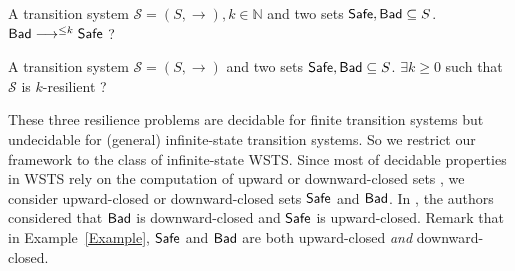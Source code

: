 {A transition system $\mathscr{S}=(S,\rightarrow), k \in \mathbb{N}$ and two sets $\Safe, \Bad \subseteq S$.}
{$\Bad \longrightarrow^{\leq k} \Safe$ ?\newline}

{A transition system $\mathscr{S}=(S,\rightarrow)$ and two sets $\Safe, \Bad \subseteq S$.}
{$\exists k \geq 0$ such that $\mathscr{S}$ is %
 $k$-resilient ?\newline}


\iffalse

\problemx{Resilience problems}
{A transition system $\mathscr{S}=(S,\rightarrow)$, two sets $\Safe, \Bad \subseteq S$, $k \in \mathbb{N}$.}
{ ({\sc resilience problem (RP)}) $\Bad \longrightarrow^{*} \Safe$ ?\newline  
({\sc $k$-resilience problem (kRP)})		$\Bad \longrightarrow^{\leq k} \Safe$ ?\newline
({\sc bounded resilience problem (BRP)})	$\exists k \geq 0$ such that $\mathscr{S}$ is 
 $k$-resilient ?\newline}

\fi


\iffalse
\begin{example}
Let us consider a VASS with only one state $q$, one counter, and one transition that substracts $-1$ from the counter, with $\Safe = \downarrow q(0)$, $\Bad = \uparrow q(1)$,
then resilience hold but not bounded resilience: for every bound $k$ there is an element of $\Bad$ e.g. $q(k+1)$ which necessitate at least $k+1$ steps before it can reach $\Safe$. 
\end{example}
\fi


  
These three resilience problems are decidable for finite transition systems but undecidable for (general) infinite-state transition systems. So we restrict our framework to the class of infinite-state WSTS. Since most of decidable properties in WSTS rely on the computation of upward or downward-closed sets \cite{DBLP:journals/iandc/AbdullaCJT00, DBLP:journals/tcs/FinkelS01}, we consider upward-closed or downward-closed sets $\Safe$ and $\Bad$. In \cite{DBLP:journals/corr/abs-2108-00889}, the authors considered that $\Bad$ is downward-closed and $\Safe$ is upward-closed. %
Remark that in Example~\ref{Example}, $\Safe$ and $\Bad$ are both upward-closed \emph{and} downward-closed.

